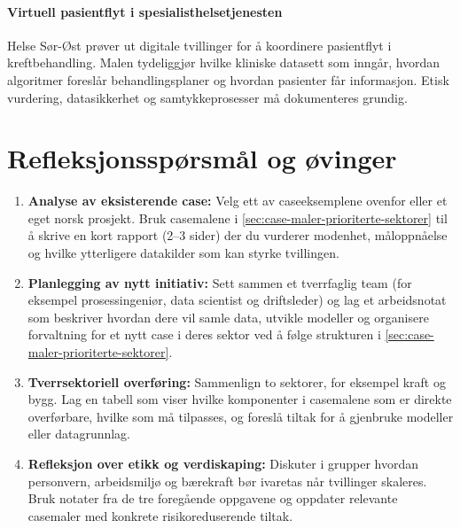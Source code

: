\paragraph{Virtuell pasientflyt i spesialisthelsetjenesten}
Helse Sør-Øst prøver ut digitale tvillinger for å koordinere pasientflyt i kreftbehandling. Malen tydeliggjør hvilke kliniske datasett som inngår, hvordan algoritmer foreslår behandlingsplaner og hvordan pasienter får informasjon. Etisk vurdering, datasikkerhet og samtykkeprosesser må dokumenteres grundig.

\section{Refleksjonsspørsmål og øvinger}
\begin{enumerate}
    \item \textbf{Analyse av eksisterende case:} Velg ett av caseeksemplene ovenfor eller et eget norsk prosjekt. Bruk casemalene i \autoref{sec:case-maler-prioriterte-sektorer} til å skrive en kort rapport (2--3 sider) der du vurderer modenhet, måloppnåelse og hvilke ytterligere datakilder som kan styrke tvillingen.
    \item \textbf{Planlegging av nytt initiativ:} Sett sammen et tverrfaglig team (for eksempel prosessingeniør, data scientist og driftsleder) og lag et arbeidsnotat som beskriver hvordan dere vil samle data, utvikle modeller og organisere forvaltning for et nytt case i deres sektor ved å følge strukturen i \autoref{sec:case-maler-prioriterte-sektorer}.
    \item \textbf{Tverrsektoriell overføring:} Sammenlign to sektorer, for eksempel kraft og bygg. Lag en tabell som viser hvilke komponenter i casemalene som er direkte overførbare, hvilke som må tilpasses, og foreslå tiltak for å gjenbruke modeller eller datagrunnlag.
    \item \textbf{Refleksjon over etikk og verdiskaping:} Diskuter i grupper hvordan personvern, arbeidsmiljø og bærekraft bør ivaretas når tvillinger skaleres. Bruk notater fra de tre foregående oppgavene og oppdater relevante casemaler med konkrete risikoreduserende tiltak.
\end{enumerate}
